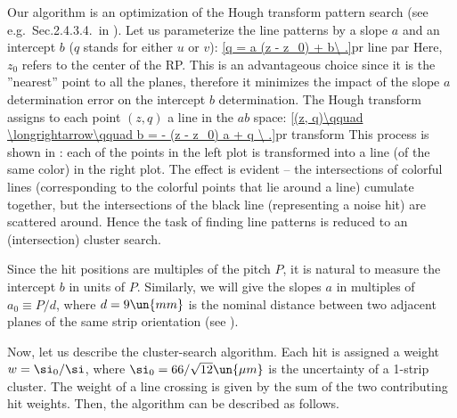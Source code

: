Our algorithm is an optimization of the Hough transform pattern search (see e.g.~Sec.2.4.3.4.~in ). Let us parameterize the line patterns by a slope $a$ and an intercept $b$ ($q$ stands for either $u$ or $v$):
\eqref{q = a (z - z_0) + b\ .}{pr line par}
Here, $z_0$ refers to the center of the RP. This is an advantageous choice since it is the ''nearest'' point to all the planes, therefore it minimizes the impact of the slope $a$ determination error on the intercept $b$ determination. The Hough transform assigns to each point $(z, q)$ a line in the $ab$ space:
\eqref{(z, q)\qquad \longrightarrow\qquad b = - (z - z_0) a + q \ .}{pr transform}
This process is shown in : each of the points in the left plot is transformed into a line (of the same color) in the right plot. The effect is evident -- the intersections of colorful lines (corresponding to the colorful points that lie around a line) cumulate together, but the intersections of the black line (representing a noise hit) are scattered around. Hence the task of finding line patterns is reduced to an (intersection) cluster search.

Since the hit positions are multiples of the pitch $P$, it is natural to measure the intercept $b$ in units of $P$. Similarly, we will give the slopes $a$ in multiples of $a_0 \equiv P / d$, where $d = 9 \un{mm}$ is the nominal distance between two adjacent planes of the same strip orientation (see ).


Now, let us describe the cluster-search algorithm. Each hit is assigned a weight $w = \si_0/\si$, where $\si_0 = 66/\sqrt{12} \un{\mu m}$ is the uncertainty of a 1-strip cluster. The weight of a line crossing is given by the sum of the two contributing hit weights. Then, the algorithm can be described as follows.

